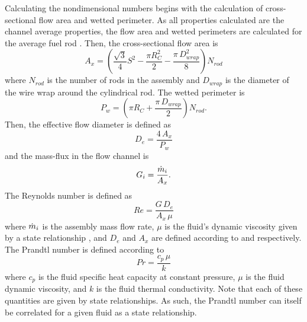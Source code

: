      Calculating the nondimensional numbers begins with the calculation of 
      cross-sectional flow area and wetted perimeter. As all properties 
      calculated are the channel average properties, the flow area and wetted
      perimeters are calculated for the average fuel rod 
      \cite{FastSpectrumReactors}. Then, the cross-sectional flow area is
      \begin{equation}
        \label{eq:correlation_ax}
        A_x = \left(\frac{\sqrt{3}}{4} S^2 - \frac{\pi R_C^2}{2} - 
          \frac{\pi \, D_{wrap}^2}{8} \right) N_{rod}
      \end{equation}
      where $N_{rod}$ is the number of rods in the 
      assembly and $D_{wrap}$ is the diameter of the wire wrap around the
      cylindrical rod. The wetted perimeter is
      \begin{equation}
        \label{eq:correlation_pw}
        P_w = \left(\pi R_C + \frac{\pi\,D_{wrap}}{2}\right) N_{rod}.
      \end{equation}
      Then, the effective flow diameter is defined as
      \begin{equation}
        \label{eq:correlation_de}
        D_e = \frac{4 \, A_x}{P_w}
      \end{equation}
      and the mass-flux in the flow channel is 
      \begin{equation}
        \label{eq:correlation_g}
        G_i = \frac{\dot{m}_i}{A_x}.
      \end{equation}
      The Reynolds number is defined as
      \begin{equation}
        \label{eq:re}
        Re = \frac{G \, D_e}{A_x \, \mu}
      \end{equation}
      where $\dot{m}_i$ is the assembly mass flow rate, $\mu$ is the fluid's
      dynamic viscosity given by a state relationship \cite{sodiumProp}, and 
      $D_e$ and $A_x$ are defined according to  and
       respectively. The Prandtl number is defined
      according to 
      \begin{equation}
        \label{eq:pr}
        Pr = \frac{c_p \, \mu}{k}
      \end{equation}
      where $c_p$ is the fluid specific heat capacity at constant pressure, 
      $\mu$ is the fluid dynamic viscosity, and $k$ is the fluid thermal 
      conductivity. Note that each of these quantities are given by state 
      relationships. As such, the Prandtl number can itself be correlated for a
      given fluid as a state relationship.
      
